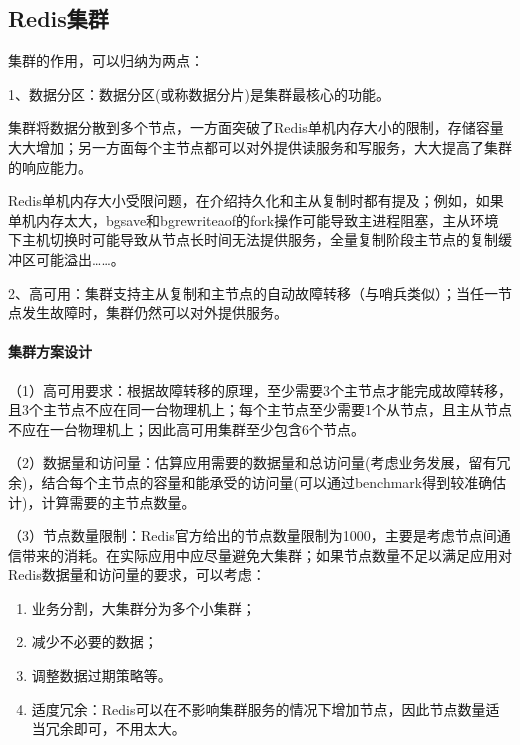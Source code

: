 \documentclass[../../../interview-questions.tex]{subfiles}
\begin{document}
\subsection{Redis集群}

集群的作用，可以归纳为两点：

1、数据分区：数据分区(或称数据分片)是集群最核心的功能。

集群将数据分散到多个节点，一方面突破了Redis单机内存大小的限制，存储容量大大增加；另一方面每个主节点都可以对外提供读服务和写服务，大大提高了集群的响应能力。

Redis单机内存大小受限问题，在介绍持久化和主从复制时都有提及；例如，如果单机内存太大，bgsave和bgrewriteaof的fork操作可能导致主进程阻塞，主从环境下主机切换时可能导致从节点长时间无法提供服务，全量复制阶段主节点的复制缓冲区可能溢出……。

2、高可用：集群支持主从复制和主节点的自动故障转移（与哨兵类似）；当任一节点发生故障时，集群仍然可以对外提供服务。

\paragraph{集群方案设计}

（1）高可用要求：根据故障转移的原理，至少需要3个主节点才能完成故障转移，且3个主节点不应在同一台物理机上；每个主节点至少需要1个从节点，且主从节点不应在一台物理机上；因此高可用集群至少包含6个节点。

（2）数据量和访问量：估算应用需要的数据量和总访问量(考虑业务发展，留有冗余)，结合每个主节点的容量和能承受的访问量(可以通过benchmark得到较准确估计)，计算需要的主节点数量。

（3）节点数量限制：Redis官方给出的节点数量限制为1000，主要是考虑节点间通信带来的消耗。在实际应用中应尽量避免大集群；如果节点数量不足以满足应用对Redis数据量和访问量的要求，可以考虑：

\begin{enumerate}
    \item {业务分割，大集群分为多个小集群；}
    \item {减少不必要的数据；}
    \item {调整数据过期策略等。}
    \item {适度冗余：Redis可以在不影响集群服务的情况下增加节点，因此节点数量适当冗余即可，不用太大。}
\end{enumerate}
\end{document}
